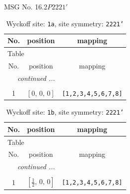 \documentclass[fleqn,8pt]{jsarticle}
\begin{document}
\setcounter{MaxMatrixCols}{32}

\renewcommand{\tablename}{Table~}
\renewcommand{\figurename}{Figure~}
\begin{center}
\LARGE
MSG No. 16.2\quad$P2221'$
\end{center}
\renewcommand{\arraystretch}{1.2}
\begin{longtable}{ccc}
\caption{Wyckoff site: {\tt 1a}, site symmetry: {\tt 2221'}}
 \\
 \hline \hline
No. & position & mapping \\ \hline \endfirsthead

\multicolumn{2}{l}{\tablename\ \thetable{}} \\
 \hline \hline
No. & position & mapping \\ \hline \endhead

 \hline \hline
\multicolumn{2}{r}{\footnotesize\it continued ...} \\ \endfoot

 \hline \hline
\multicolumn{2}{r}{} \\ \endlastfoot

1 & $\left[ 0,\, 0,\, 0 \right]$ & {\tt [1,2,3,4,5,6,7,8]} \\
\end{longtable}
\renewcommand{\arraystretch}{1.2}
\begin{longtable}{ccc}
\caption{Wyckoff site: {\tt 1b}, site symmetry: {\tt 2221'}}
 \\
 \hline \hline
No. & position & mapping \\ \hline \endfirsthead

\multicolumn{2}{l}{\tablename\ \thetable{}} \\
 \hline \hline
No. & position & mapping \\ \hline \endhead

 \hline \hline
\multicolumn{2}{r}{\footnotesize\it continued ...} \\ \endfoot

 \hline \hline
\multicolumn{2}{r}{} \\ \endlastfoot

1 & $\left[ \frac{1}{2},\, 0,\, 0 \right]$ & {\tt [1,2,3,4,5,6,7,8]} \\
\end{longtable}
\renewcommand{\arraystretch}{1.2}
\end{document}
